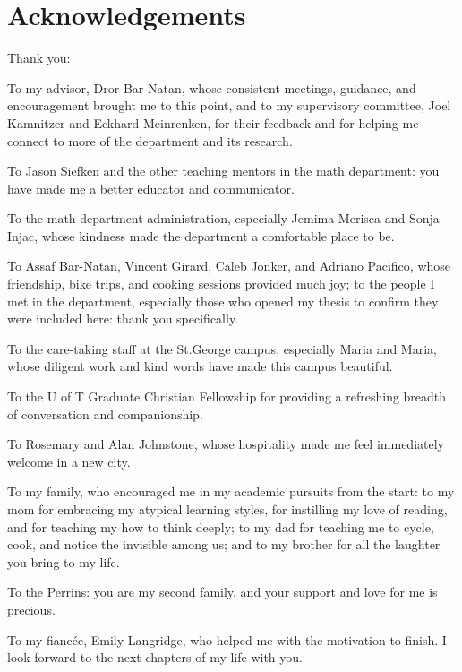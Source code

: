 
\begingroup
\let\clearpage\relax
\let\cleardoublepage\relax

\chapter*{Acknowledgements}

Thank you:

To my advisor, Dror Bar-Natan, whose consistent meetings, guidance, and
encouragement brought me to this point, and to my supervisory committee, Joel
Kamnitzer and Eckhard Meinrenken, for their feedback and for helping me connect
to more of the department and its research.

To Jason Siefken and the other teaching mentors in the math department: you have
made me a better educator and communicator.

To the math department administration, especially Jemima Merisca and Sonja
Injac, whose kindness made the department a comfortable place to be.

To Assaf Bar-Natan, Vincent Girard, Caleb Jonker, and Adriano Pacifico, whose
friendship, bike trips, and cooking sessions provided much joy; to the people I
met in the department, especially those who opened my thesis to confirm they
were included here: thank you specifically.

To the care-taking staff at the St.\@ George campus, especially Maria and Maria,
whose diligent work and kind words have made this campus beautiful.

To the U of T Graduate Christian Fellowship for providing a refreshing breadth
of conversation and companionship.

To Rosemary and Alan Johnstone, whose hospitality made me feel immediately
welcome in a new city.

To my family, who encouraged me in my academic pursuits from the start: to my
mom for embracing my atypical learning styles, for instilling my love of
reading, and for teaching my how to think deeply; to my dad for teaching me to
cycle, cook, and notice the invisible among us; and to my brother for all the
laughter you bring to my life.

To the Perrins: you are my second family, and your support and love for me is
precious.

To my fiancée, Emily Langridge, who helped me with the motivation to
finish. I look forward to the next chapters of my life with you.

\endgroup
